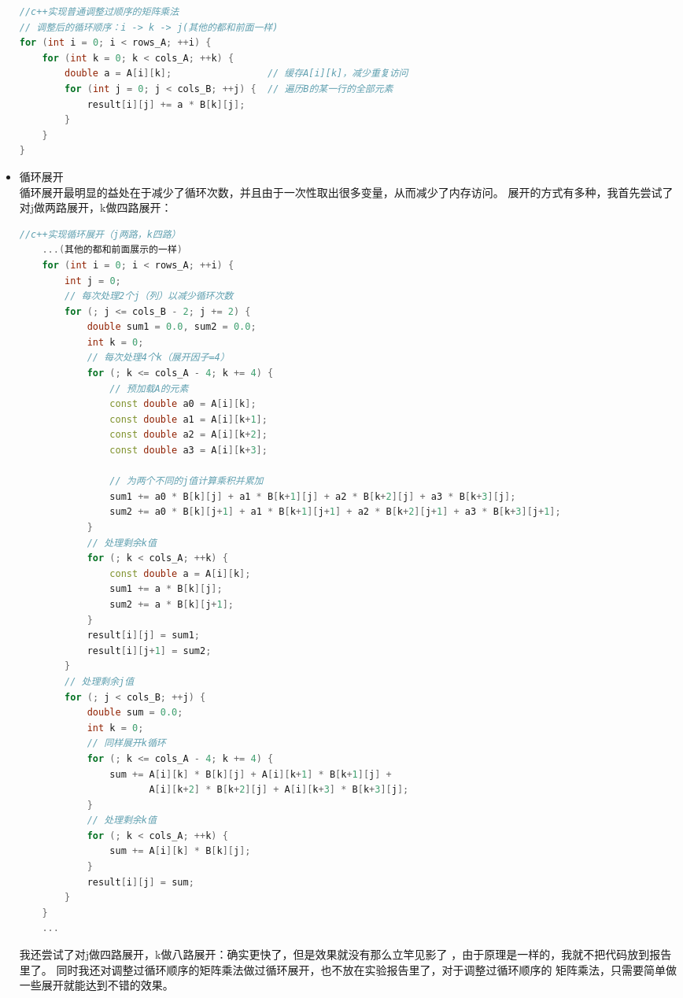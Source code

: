 \documentclass{SYSUReport}
\begin{document}
\begin{itemize}
\begin{lstlisting}[language=c++]
//c++实现普通调整过顺序的矩阵乘法
// 调整后的循环顺序：i -> k -> j(其他的都和前面一样)
for (int i = 0; i < rows_A; ++i) {         
    for (int k = 0; k < cols_A; ++k) {      
        double a = A[i][k];                 // 缓存A[i][k]，减少重复访问
        for (int j = 0; j < cols_B; ++j) {  // 遍历B的某一行的全部元素
            result[i][j] += a * B[k][j];    
        }
    }
}
    \end{lstlisting}
\item 循环展开\\
循环展开最明显的益处在于减少了循环次数，并且由于一次性取出很多变量，从而减少了内存访问。
展开的方式有多种，我首先尝试了对j做两路展开，k做四路展开：
\begin{lstlisting}[language=c++]
    //c++实现循环展开（j两路，k四路）
    ...(其他的都和前面展示的一样)
    for (int i = 0; i < rows_A; ++i) {
        int j = 0;
        // 每次处理2个j（列）以减少循环次数
        for (; j <= cols_B - 2; j += 2) {
            double sum1 = 0.0, sum2 = 0.0;
            int k = 0;
            // 每次处理4个k（展开因子=4）
            for (; k <= cols_A - 4; k += 4) {
                // 预加载A的元素
                const double a0 = A[i][k];
                const double a1 = A[i][k+1];
                const double a2 = A[i][k+2];
                const double a3 = A[i][k+3];

                // 为两个不同的j值计算乘积并累加
                sum1 += a0 * B[k][j] + a1 * B[k+1][j] + a2 * B[k+2][j] + a3 * B[k+3][j];
                sum2 += a0 * B[k][j+1] + a1 * B[k+1][j+1] + a2 * B[k+2][j+1] + a3 * B[k+3][j+1];
            }
            // 处理剩余k值
            for (; k < cols_A; ++k) {
                const double a = A[i][k];
                sum1 += a * B[k][j];
                sum2 += a * B[k][j+1];
            }
            result[i][j] = sum1;
            result[i][j+1] = sum2;
        }
        // 处理剩余j值
        for (; j < cols_B; ++j) {
            double sum = 0.0;
            int k = 0;
            // 同样展开k循环
            for (; k <= cols_A - 4; k += 4) {
                sum += A[i][k] * B[k][j] + A[i][k+1] * B[k+1][j] +
                       A[i][k+2] * B[k+2][j] + A[i][k+3] * B[k+3][j];
            }
            // 处理剩余k值
            for (; k < cols_A; ++k) {
                sum += A[i][k] * B[k][j];
            }
            result[i][j] = sum;
        }
    }
    ...
        \end{lstlisting}
我还尝试了对j做四路展开，k做八路展开：确实更快了，但是效果就没有那么立竿见影了
，由于原理是一样的，我就不把代码放到报告里了。
同时我还对调整过循环顺序的矩阵乘法做过循环展开，也不放在实验报告里了，对于调整过循环顺序的
矩阵乘法，只需要简单做一些展开就能达到不错的效果。


\end{itemize}
\end{document}

